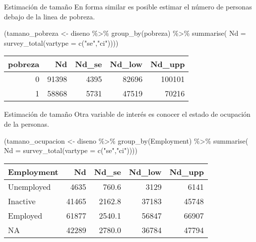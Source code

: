 \documentclass[
  ignorenonframetext,
]{beamer}
\newenvironment{Shaded}{\begin{snugshade}}{\end{snugshade}}
\newcommand{\AttributeTok}[1]{\textcolor[rgb]{0.77,0.63,0.00}{#1}}
\newcommand{\FunctionTok}[1]{\textcolor[rgb]{0.00,0.00,0.00}{#1}}
\newcommand{\NormalTok}[1]{#1}
\newcommand{\OtherTok}[1]{\textcolor[rgb]{0.56,0.35,0.01}{#1}}
\newcommand{\SpecialCharTok}[1]{\textcolor[rgb]{0.00,0.00,0.00}{#1}}
\newcommand{\StringTok}[1]{\textcolor[rgb]{0.31,0.60,0.02}{#1}}
\begin{document}
\begin{frame}[fragile]{Estimación de tamaño}
\protect\hypertarget{estimaciuxf3n-de-tamauxf1o-2}{}
En forma similar es posible estimar el número de personas debajo de la
linea de pobreza.

\begin{Shaded}
\begin{Highlighting}[]
\NormalTok{(tamano\_pobreza }\OtherTok{\textless{}{-}}\NormalTok{ diseno }\SpecialCharTok{\%\textgreater{}\%} 
   \FunctionTok{group\_by}\NormalTok{(pobreza) }\SpecialCharTok{\%\textgreater{}\%} 
   \FunctionTok{summarise}\NormalTok{(}
       \AttributeTok{Nd =} \FunctionTok{survey\_total}\NormalTok{(}\AttributeTok{vartype =} \FunctionTok{c}\NormalTok{(}\StringTok{"se"}\NormalTok{,}\StringTok{"ci"}\NormalTok{))))}
\end{Highlighting}
\end{Shaded}

\begin{longtable}[]{@{}rrrrr@{}}
\toprule
pobreza & Nd & Nd\_se & Nd\_low & Nd\_upp \\
\midrule
\endhead
0 & 91398 & 4395 & 82696 & 100101 \\
1 & 58868 & 5731 & 47519 & 70216 \\
\bottomrule
\end{longtable}
\end{frame}

\begin{frame}[fragile]{Estimación de tamaño}
\protect\hypertarget{estimaciuxf3n-de-tamauxf1o-3}{}
Otra variable de interés es conocer el estado de ocupación de la
personas.

\begin{Shaded}
\begin{Highlighting}[]
\NormalTok{(tamano\_ocupacion }\OtherTok{\textless{}{-}}\NormalTok{ diseno }\SpecialCharTok{\%\textgreater{}\%} 
   \FunctionTok{group\_by}\NormalTok{(Employment) }\SpecialCharTok{\%\textgreater{}\%} 
   \FunctionTok{summarise}\NormalTok{(}
       \AttributeTok{Nd =} \FunctionTok{survey\_total}\NormalTok{(}\AttributeTok{vartype =} \FunctionTok{c}\NormalTok{(}\StringTok{"se"}\NormalTok{,}\StringTok{"ci"}\NormalTok{))))}
\end{Highlighting}
\end{Shaded}

\begin{longtable}[]{@{}lrrrr@{}}
\toprule
Employment & Nd & Nd\_se & Nd\_low & Nd\_upp \\
\midrule
\endhead
Unemployed & 4635 & 760.6 & 3129 & 6141 \\
Inactive & 41465 & 2162.8 & 37183 & 45748 \\
Employed & 61877 & 2540.1 & 56847 & 66907 \\
NA & 42289 & 2780.0 & 36784 & 47794 \\
\bottomrule
\end{longtable}
\end{frame}
\end{document}
